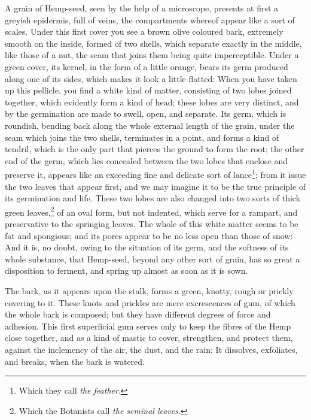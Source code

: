 \documentclass[a4paper, 11pt, oneside, polutonikogreek, english]{article}
\begin{document}
A grain of Hemp-seed, seen by the help of a microscope, presents at first a greyish epidermis, full of veins, the compartments whereof appear like a sort of scales. Under this first cover you see a brown olive coloured bark, extremely smooth on the inside, formed of two shells, which separate exactly in the middle, like those of a nut, the seam that joins them being quite imperceptible. Under a green cover, its kernel, in the form of a little orange, bears its germ produced along one of its sides, which makes it look a little flatted: When you have taken up this pellicle, you find a white kind of matter, consisting of two lobes joined together, which evidently form a kind of head; these lobes are very distinct, and by the germination are made to swell, open, and separate. Its germ, which is roundish, bending back along the whole external length of the grain, under the seam which joins the two shells, terminates in a point, and forms a kind of tendril, which is the only part that pierces the ground to form the root; the other end of the germ, which lies concealed between the two lobes that enclose and preserve it, appears like an exceeding fine and delicate sort of lance\footnote{Which they call \emph{the feather}.}; from it issue the two leaves that appear first, and we may imagine it to be the true principle of its germination and life. These two lobes are also changed into two sorts of thick green leaves,\footnote{Which the Botanists call \emph{the seminal leaves}.} of an oval form, but not indented, which serve for a rampart, and preservative to the springing leaves. The whole of this white matter seems to be fat and spongious; and its pores appear to be no less open than those of snow: And it is, no doubt, owing to the situation of its germ, and the softness of its whole substance, that Hemp-seed, beyond any other sort of grain, has so great a disposition to ferment, and spring up almost as soon as it is sown.

The bark, as it appears upon the stalk, forms a green, knotty, rough or prickly covering to it. These knots and prickles are mere excrescences of gum, of which the whole bark is composed; but they have different degrees of force and adhesion. This first superficial gum serves only to keep the fibres of the Hemp close together, and as a kind of mastic to cover, strengthen, and protect them, against the inclemency of the air, the dust, and the rain: It dissolves, exfoliates, and breaks, when the bark is watered.
\end{document}
